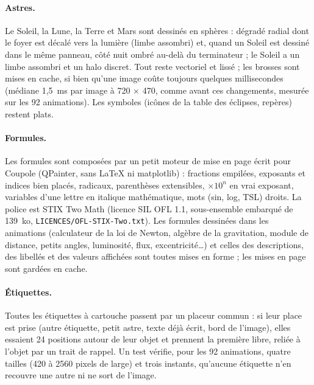 \paragraph{Astres.} Le Soleil, la Lune, la Terre et Mars sont dessinés en sphères : dégradé radial dont le foyer est
décalé vers la lumière (limbe assombri) et, quand un Soleil est dessiné dans le même panneau, côté nuit ombré au-delà du
terminateur ; le Soleil a un limbe assombri et un halo discret. Tout reste vectoriel et lissé ; les brosses sont mises
en cache, si bien qu'une image coûte toujours quelques millisecondes (médiane 1,5~ms par image à 720 × 470, comme avant ces changements, mesurée sur les
92 animations). Les symboles (icônes de la table des éclipses, repères) restent plats.

\paragraph{Formules.} Les formules sont composées par un petit moteur de mise en page écrit pour Coupole (QPainter,
sans \LaTeX{} ni matplotlib) : fractions empilées, exposants et indices bien placés, radicaux, parenthèses extensibles,
$\times 10^n$ en vrai exposant, variables d'une lettre en italique mathématique, mots (sin, log, TSL) droits. La police
est STIX Two Math (licence SIL OFL 1.1, sous-ensemble embarqué de 139~ko, \texttt{LICENCES/OFL-STIX-Two.txt}). Les
formules dessinées dans les animations (calculateur de la loi de Newton, algèbre de la gravitation, module de distance,
petits angles, luminosité, flux, excentricité…) et celles des descriptions, des libellés et des valeurs affichées sont
toutes mises en forme ; les mises en page sont gardées en cache.

\paragraph{Étiquettes.} Toutes les étiquettes à cartouche passent par un placeur commun : si leur place est prise
(autre étiquette, petit astre, texte déjà écrit, bord de l'image), elles essaient 24 positions autour de leur objet et
prennent la première libre, reliée à l'objet par un trait de rappel. Un test vérifie, pour les 92 animations, quatre
tailles (420 à 2560 pixels de large) et trois instants, qu'aucune étiquette n'en recouvre une autre ni ne sort de
l'image.

